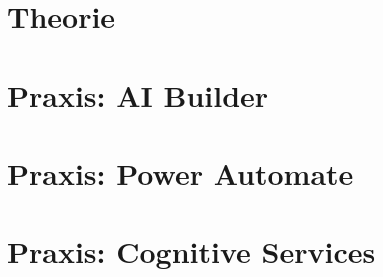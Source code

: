 
\section{Theorie}







\section{Praxis: AI Builder}



\section{Praxis: Power Automate}



\section{Praxis: Cognitive Services}





